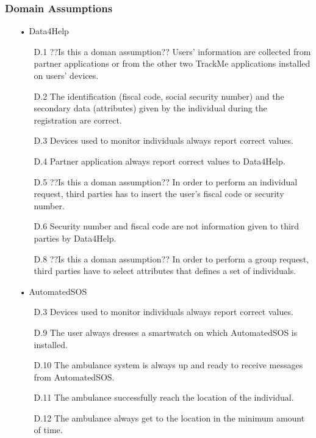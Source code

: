 \subsubsection{Domain Assumptions}
\begin{enumerate}

\item[•] {\Large Data4Help}
	\begin{enumerate}
	\item [D.1] ??Is this a doman assumption?? Users' information are collected from partner applications or from the other two TrackMe applications installed on users' devices.
	\item [D.2] The identification (fiscal code, social security number) and the secondary data (attributes) given by the individual during the registration are correct.
    \item [D.3] Devices used to monitor individuals always report correct values.
    \item [D.4] Partner application always report correct values to Data4Help.
	\item [D.5] ??Is this a doman assumption?? In order to perform an individual request, third parties has to insert the user's fiscal code or security number.
	\item [D.6] Security number and fiscal code are not information given to third parties by Data4Help.
	\item [D.8] ??Is this a doman assumption?? In order to perform a group request, third parties have to select attributes that defines a set of individuals.
	\end{enumerate}
	
\item[•] {\Large AutomatedSOS}
	\begin{enumerate}
	\item [D.3] Devices used to monitor individuals always report correct values.
	\item [D.9] The user always dresses a smartwatch on which AutomatedSOS is installed.    
	\item [D.10] The ambulance system is always up and ready to receive messages from AutomatedSOS.
    \item [D.11] The ambulance successfully reach the location of the individual.
    \item [D.12] The ambulance always get to the location in the minimum amount of time.
    
	\end{enumerate}
	

\end{enumerate}
